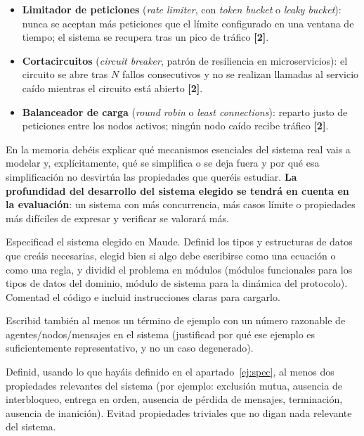 \begin{listaejercicios}
\begin{itemize}
\item
\textbf{Limitador de peticiones} (\emph{rate limiter}, con \emph{token bucket}
o \emph{leaky bucket}): nunca se aceptan m\'as peticiones que el l\'imite
configurado en una ventana de tiempo; el sistema se recupera tras un pico de
tr\'afico \textbf{[2]}.

\item
\textbf{Cortacircuitos} (\emph{circuit breaker}, patr\'on de resiliencia en
microservicios): el circuito se abre tras $N$ fallos consecutivos y no se
realizan llamadas al servicio ca\'ido mientras el circuito est\'a abierto \textbf{[2]}.

\item
\textbf{Balanceador de carga} (\emph{round robin} o \emph{least connections}):
reparto justo de peticiones entre los nodos activos; ning\'un nodo ca\'ido
recibe tr\'afico \textbf{[2]}.
\end{itemize}

En la memoria deb\'eis explicar qu\'e mecanismos esenciales del sistema real
vais a modelar y, expl\'icitamente, qu\'e se simplifica o se deja fuera y por
qu\'e esa simplificaci\'on no desvirt\'ua las propiedades que quer\'eis
estudiar. \textbf{La profundidad del desarrollo del sistema elegido se tendr\'a en cuenta en
la evaluaci\'on}: un sistema con m\'as concurrencia, m\'as casos l\'imite o
propiedades m\'as dif\'iciles de expresar y verificar se valorar\'a m\'as.

\item\label{ej:spec}
Especificad el sistema elegido en Maude. Definid los tipos y estructuras de
datos que cre\'ais necesarias, elegid bien si algo debe escribirse como una
ecuaci\'on o como una regla, y dividid el problema en m\'odulos (m\'odulos
funcionales para los tipos de datos del dominio, m\'odulo de sistema para la
din\'amica del protocolo). Comentad el c\'odigo e incluid instrucciones
claras para cargarlo.

Escribid tambi\'en al menos un t\'ermino de ejemplo con un n\'umero razonable
de agentes/\allowbreak nodos/\allowbreak mensajes en el sistema (justificad por qu\'e ese ejemplo es
suficientemente representativo, y no un caso degenerado).

\item\label{ej:props}
Definid, usando lo que hay\'ais definido en el apartado~\ref{ej:spec}, al
menos dos propiedades relevantes del sistema (por ejemplo: exclusi\'on
mutua, ausencia de interbloqueo, entrega en orden, ausencia de p\'erdida de
mensajes, terminaci\'on, ausencia de inanici\'on). Evitad propiedades
triviales que no digan nada relevante del sistema.


\end{listaejercicios}
